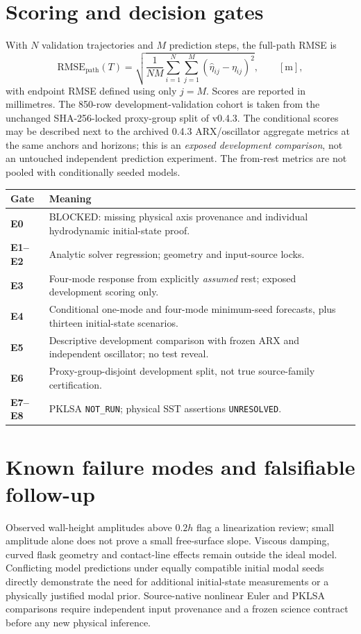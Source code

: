 \documentclass[10pt,a4paper]{article}
\begin{document}
\section*{Scoring and decision gates}
With $N$ validation trajectories and $M$ prediction steps, the full-path RMSE is
\[
\mathrm{RMSE}_{\mathrm{path}}(T)=\sqrt{\frac{1}{NM}\sum_{i=1}^N\sum_{j=1}^M (\hat\eta_{ij}-\eta_{ij})^2},\qquad [\mathrm{m}],
\]
with endpoint RMSE defined using only $j=M$. Scores are reported in millimetres. The 850-row development-validation cohort is taken from the unchanged SHA-256-locked proxy-group split of v0.4.3. The conditional scores may be described next to the archived 0.4.3 ARX/oscillator aggregate metrics at the same anchors and horizons; this is an \emph{exposed development comparison}, not an untouched independent prediction experiment. The from-rest metrics are not pooled with conditionally seeded models.

\begin{center}\begin{tabular}{>{\bfseries}p{20mm}p{111mm}}\toprule
Gate & Meaning\\\midrule
E0 & \textcolor{red!70!black}{BLOCKED}: missing physical axis provenance and individual hydrodynamic initial-state proof.\\
E1--E2 & Analytic solver regression; geometry and input-source locks.\\
E3 & Four-mode response from explicitly \emph{assumed} rest; exposed development scoring only.\\
E4 & Conditional one-mode and four-mode minimum-seed forecasts, plus thirteen initial-state scenarios.\\
E5 & Descriptive development comparison with frozen ARX and independent oscillator; no test reveal.\\
E6 & Proxy-group-disjoint development split, not true source-family certification.\\
E7--E8 & PKLSA \texttt{NOT\_RUN}; physical SST assertions \texttt{UNRESOLVED}.\\\bottomrule\end{tabular}\end{center}

\section*{Known failure modes and falsifiable follow-up}
Observed wall-height amplitudes above $0.2h$ flag a linearization review; small amplitude alone does not prove a small free-surface slope. Viscous damping, curved flask geometry and contact-line effects remain outside the ideal model. Conflicting model predictions under equally compatible initial modal seeds directly demonstrate the need for additional initial-state measurements or a physically justified modal prior. Source-native nonlinear Euler and PKLSA comparisons require independent input provenance and a frozen science contract before any new physical inference.
\end{document}
